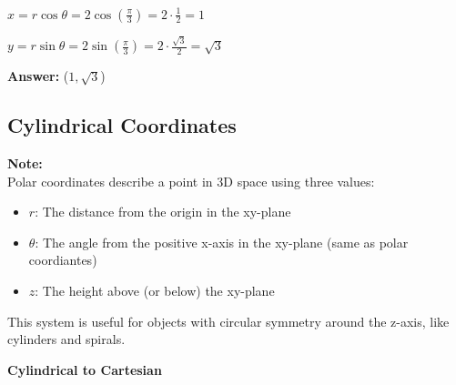 \documentclass[10pt]{article}                               %
\begin{document}
\begin{tcolorbox}
\begin{adjustwidth}{2em}{0pt}
\begin{adjustwidth}{2em}{0pt}
\begin{tcolorbox}
                \begin{adjustwidth}{2em}{0pt}

                    \( x = r\cos\theta = 2\cos\left(\frac{\pi}{3}\right) = 2 \cdot \frac{1}{2} = 1 \)

                    \( y = r\sin\theta = 2\sin\left(\frac{\pi}{3}\right) = 2 \cdot \frac{\sqrt{3}}{2} = \sqrt{3} \)

                    \textbf{Answer:} (\( 1,\sqrt{3} \))

                \end{adjustwidth}

            \end{tcolorbox}


        \end{adjustwidth}


        \subsection*{Cylindrical Coordinates}

        \begin{adjustwidth}{2em}{0pt}

            \begin{tcolorbox}[enhanced, colback=white, colframe=black, boxrule=0.5pt]

                \textbf{Note:} \\
                Polar coordinates describe a point in 3D space using three values:

                \begin{itemize}
                    \item \( r \): The distance from the origin in the xy-plane
                    \item \( \theta \): The angle from the positive x-axis in the xy-plane (same as polar coordiantes)
                    \item \( z \): The height above (or below) the xy-plane
                \end{itemize}

                This system is useful for objects with circular symmetry around the z-axis, like cylinders and spirals.

            \end{tcolorbox}

            \vspace{0.5em}

            \textbf{Cylindrical to Cartesian}


\end{adjustwidth}
\end{adjustwidth}
\end{tcolorbox}
\end{document}
